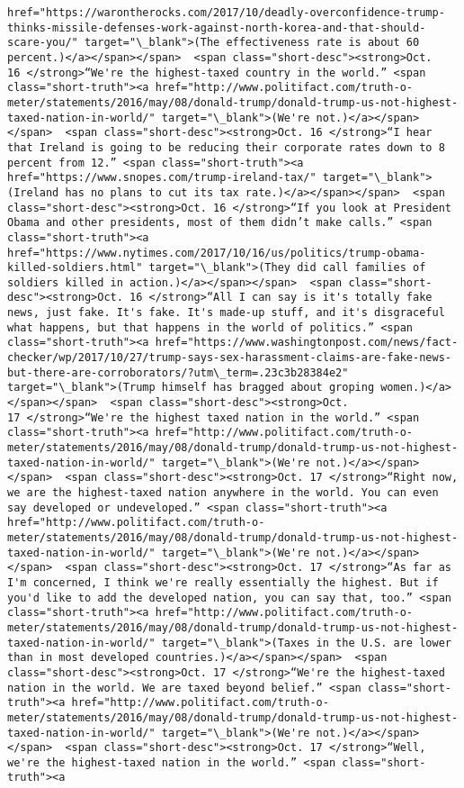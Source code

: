 \documentclass[11pt]{article}
\begin{document}
\begin{Verbatim}[commandchars=\\\{\}]
href="https://warontherocks.com/2017/10/deadly-overconfidence-trump-thinks-missile-defenses-work-against-north-korea-and-that-should-scare-you/" target="\_blank">(The effectiveness rate is about 60 percent.)</a></span></span>  <span class="short-desc"><strong>Oct. 16 </strong>“We're the highest-taxed country in the world.” <span class="short-truth"><a href="http://www.politifact.com/truth-o-meter/statements/2016/may/08/donald-trump/donald-trump-us-not-highest-taxed-nation-in-world/" target="\_blank">(We're not.)</a></span></span>  <span class="short-desc"><strong>Oct. 16 </strong>“I hear that Ireland is going to be reducing their corporate rates down to 8 percent from 12.” <span class="short-truth"><a href="https://www.snopes.com/trump-ireland-tax/" target="\_blank">(Ireland has no plans to cut its tax rate.)</a></span></span>  <span class="short-desc"><strong>Oct. 16 </strong>“If you look at President Obama and other presidents, most of them didn’t make calls.” <span class="short-truth"><a href="https://www.nytimes.com/2017/10/16/us/politics/trump-obama-killed-soldiers.html" target="\_blank">(They did call families of soldiers killed in action.)</a></span></span>  <span class="short-desc"><strong>Oct. 16 </strong>“All I can say is it's totally fake news, just fake. It's fake. It's made-up stuff, and it's disgraceful what happens, but that happens in the world of politics.” <span class="short-truth"><a href="https://www.washingtonpost.com/news/fact-checker/wp/2017/10/27/trump-says-sex-harassment-claims-are-fake-news-but-there-are-corroborators/?utm\_term=.23c3b28384e2" target="\_blank">(Trump himself has bragged about groping women.)</a></span></span>  <span class="short-desc"><strong>Oct. 17 </strong>“We're the highest taxed nation in the world.” <span class="short-truth"><a href="http://www.politifact.com/truth-o-meter/statements/2016/may/08/donald-trump/donald-trump-us-not-highest-taxed-nation-in-world/" target="\_blank">(We're not.)</a></span></span>  <span class="short-desc"><strong>Oct. 17 </strong>“Right now, we are the highest-taxed nation anywhere in the world. You can even say developed or undeveloped.” <span class="short-truth"><a href="http://www.politifact.com/truth-o-meter/statements/2016/may/08/donald-trump/donald-trump-us-not-highest-taxed-nation-in-world/" target="\_blank">(We're not.)</a></span></span>  <span class="short-desc"><strong>Oct. 17 </strong>“As far as I'm concerned, I think we're really essentially the highest. But if you'd like to add the developed nation, you can say that, too.” <span class="short-truth"><a href="http://www.politifact.com/truth-o-meter/statements/2016/may/08/donald-trump/donald-trump-us-not-highest-taxed-nation-in-world/" target="\_blank">(Taxes in the U.S. are lower than in most developed countries.)</a></span></span>  <span class="short-desc"><strong>Oct. 17 </strong>“We're the highest-taxed nation in the world. We are taxed beyond belief.” <span class="short-truth"><a href="http://www.politifact.com/truth-o-meter/statements/2016/may/08/donald-trump/donald-trump-us-not-highest-taxed-nation-in-world/" target="\_blank">(We're not.)</a></span></span>  <span class="short-desc"><strong>Oct. 17 </strong>“Well, we're the highest-taxed nation in the world.” <span class="short-truth"><a 
\end{Verbatim}
\end{document}
